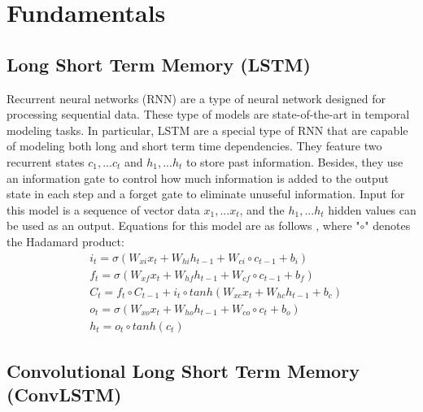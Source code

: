

\section{Fundamentals}

\subsection{Long Short Term Memory (LSTM)}

Recurrent neural networks (RNN) are a type of neural network designed for processing sequential data. These type of models are state-of-the-art in temporal modeling tasks\cite{ma2017ts}. In particular, LSTM are a special type of RNN that are capable of modeling both long and short term time dependencies. They feature two recurrent states $c_1,...c_t$ and $h_1,...h_t$ to store past information. Besides, they use an information gate to control how much information is added to the output state in each step and a forget gate to eliminate unuseful information. Input for this model is a sequence of vector data $x_1,...x_t$, and the $h_1,...h_t$ hidden values can be used as an output. Equations for this model are as follows \cite{convlstm}, where "$\circ$" denotes the Hadamard product:
\begin{align*}
& i_t=\sigma (W_{xi}x_t+W_{hi} h_{t-1} + W_{ci}\circ c_{t-1}+b_i) \\
& f_t=\sigma (W_{xf} x_t+W_{hf} h_{t-1} + W_{cf}\circ c_{t-1}+b_f) \\
& C_t=f_t\circ C_{t-1}+i_t\circ tanh(W_{xc} x_t+W_{hc} h_{t-1}+b_c) \\
& o_t=\sigma (W_{xo} x_t+W_{ho} h_{t-1} + W_{co} \circ c_{t}+b_o) \\
& h_t=o_t\circ tanh(c_t)
\end{align*}

\subsection{Convolutional Long Short Term Memory (ConvLSTM)}

